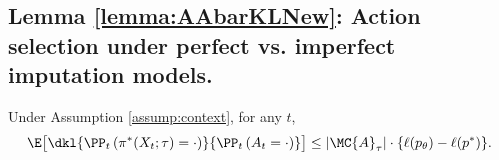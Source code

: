 \subsection{Lemma \ref{lemma:AAbarKLNew}: Action selection under perfect vs. imperfect imputation models.} 
\begin{lemma}
\label{lemma:AAbarKLNew}
Under Assumption \ref{assump:context}, for any $t$,
\begin{align*}
    \E \big[ \dkl{\PP_t \left(\pi^*(X_t; \tau) = \cdot \right)}{\PP_t \left(A_t = \cdot \right)} \big]
    \leq |\MC{A}_{\tau}| \cdot \{ \ell(p_{\theta}) - \ell(p^*) \}.
\end{align*}
\end{lemma}

